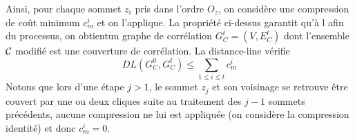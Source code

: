 Ainsi, pour chaque sommet $z_i$ pris dans l'ordre $O_z$, on consid\`ere une compression de co\^ut minimum $c_m^i$ et on l'applique.
La propri\'et\'e ci-dessus garantit qu'\`a l afin du processus, on obtientun graphe de corr\'elation $G_C^t = (V, E_C^t)$ dont l'ensemble $\cal C$ modifi\'e est une couverture de corr\'elation. 
La distance-line v\'erifie  
$$DL( G_{C}^{0}, G_{C}^{t}) \le \sum_{1 \le i \le t } c_{m}^{i}$$
Notons que lors d'une \'etape $j > 1$, le sommet $z_j$ et son voisinage se retrouve \^etre couvert par une ou deux cliques suite au traitement des $j-1$ sommets pr\'ec\'edents, aucune compression ne lui est appliqu\'ee (on consid\`ere la compression identit\'e) et donc 
$c_{m}^{i} = 0$.



%
